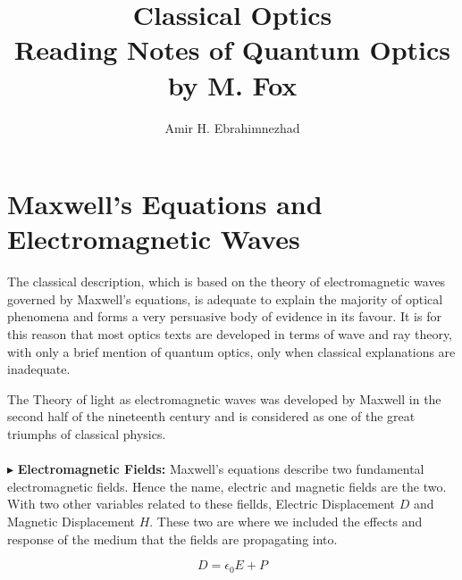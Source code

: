 \documentclass[10pt,a4paper,twocolumn]{article}
\title{Classical Optics \\ \large Reading Notes of Quantum Optics by M. Fox}
\author{Amir H. Ebrahimnezhad}
\date{}
\newcounter{theo}
\newcommand{\newpoint}[1]{\\ \ \\$\blacktriangleright$ \textbf{#1}}
\begin{document}
          \maketitle
          \tableofcontents 
          \section{Maxwell's Equations and Electromagnetic Waves}
        \indent The classical description, which is based on the theory of electromagnetic waves governed by Maxwell's equations, is adequate to explain the majority of optical phenomena and forms a very persuasive body of evidence in its favour. It is for this reason that most optics texts are developed in terms of wave and ray theory, with only a brief mention of quantum optics, only when classical explanations are inadequate.

        The Theory of light as electromagnetic waves was developed by Maxwell in the second half of the nineteenth century and is considered as one of the great triumphs of classical physics.
        \newpoint{Electromagnetic Fields: }Maxwell's equations describe two fundamental electromagnetic fields. Hence the name, electric and magnetic fields are the two. With two other variables related to these fiellds, Electric Displacement $D$ and Magnetic Displacement $H$. These two are where we included the effects and response of the medium that the fields are propagating into.

        \begin{equation}
            D =\epsilon_0 E +P
        \end{equation}
\end{document}
